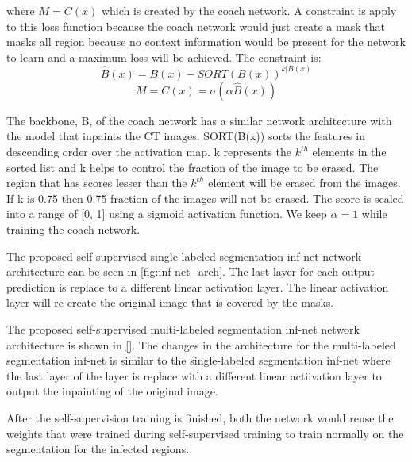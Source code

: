 where $M = C(x)$ which is created by the coach network. A constraint is apply to this loss function because the coach network would just create a mask that masks all region because no context information would be present for the network to learn and a maximum loss will be achieved. The constraint is:
\begin{equation}
\hat{B}(x) = B(x) - SORT(B(x))^{k|B(x)} 
\end{equation}
\begin{equation}
M = C(x) = \sigma (\alpha \hat{B}(x))
\end{equation}

The backbone, B, of the coach network has a similar network architecture with the model that inpaints the CT images. SORT(B(x)) sorts the features in descending order over the activation map. k represents the $k^{th}$ elements in the sorted list and k helps to control the fraction of the image to be erased. The region that has scores lesser than the $k^{th}$ element will be erased from the images. If k is 0.75 then 0.75 fraction of the images will not be erased. The score is scaled into a range of [0, 1] using a sigmoid activation function. We keep $\alpha = 1$ while training the coach network.

The proposed self-supervised single-labeled segmentation inf-net network architecture can be seen in \ref{fig:inf-net_arch}. The last layer for each output prediction is replace to a different linear activation layer. The linear activation layer will re-create the original image that is covered by the masks. 

The proposed self-supervised multi-labeled segmentation inf-net network architecture is shown in \ref{}. The changes in the architecture for the multi-labeled segmentation inf-net is similar to the single-labeled segmentation inf-net where the last layer of the layer is replace with a different linear actiivation layer to output the inpainting of the original image. 

After the self-supervision training is finished, both the network would reuse the weights that were trained during self-supervised training to train normally on the segmentation for the infected regions.

